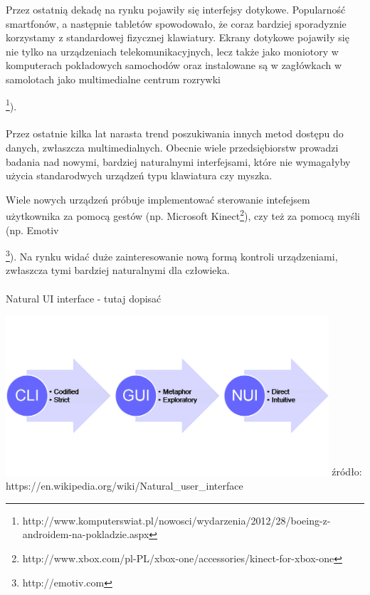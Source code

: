 \documentclass[12pt]{article}
\begin{document}
Przez ostatnią dekadę na rynku pojawiły się interfejsy dotykowe. Popularność smartfonów, a następnie tabletów spowodowało, że coraz bardziej sporadyznie korzystamy z standardowej fizycznej klawiatury.
Ekrany dotykowe pojawiły się nie tylko na urządzeniach telekomunikacyjnych, lecz także jako moniotory w komputerach pokładowych samochodów oraz instalowane są w zagłówkach w samolotach jako multimedialne centrum rozrywki {\footnote{http://www.komputerswiat.pl/nowosci/wydarzenia/2012/28/boeing-z-androidem-na-pokladzie.aspx}).
\paragraph{}
Przez ostatnie kilka lat narasta trend poszukiwania innych metod dostępu do danych, zwłaszcza multimedialnych. Obecnie wiele przedsiębiorstw prowadzi badania nad nowymi, bardziej naturalnymi interfejsami, które nie wymagałyby użycia standarodwych urządzeń typu klawiatura czy myszka.

Wiele nowych urządzeń próbuje implementować sterowanie intefejsem użytkownika za pomocą gestów (np. Microsoft Kinect\footnote{http://www.xbox.com/pl-PL/xbox-one/accessories/kinect-for-xbox-one}), czy też za pomocą myśli (np. Emotiv {\footnote{http://emotiv.com}). Na rynku widać duże zainteresowanie nową formą kontroli urządzeniami, zwłaszcza tymi bardziej naturalnymi dla człowieka.

\paragraph{}
{\color{red}Natural UI interface - tutaj dopisać}

\begin{center}
\includegraphics[width=0.9\textwidth]{images/nui.png}
\small {źródło: https://en.wikipedia.org/wiki/Natural_user_interface }
\end{center}

}}
\end{document}
